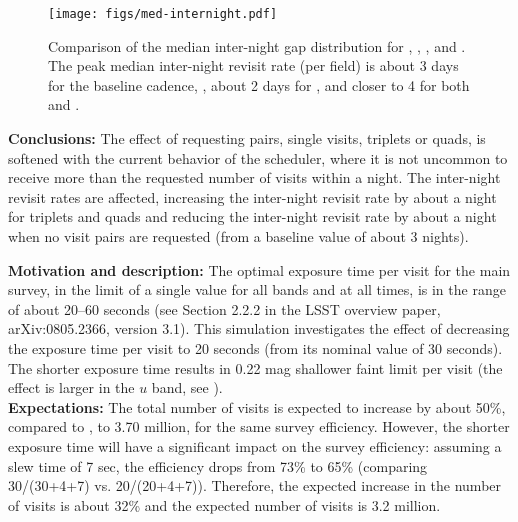 \begin{figure}[h]
\texttt{[image: figs/med-internight.pdf]}
\caption{
Comparison of the median inter-night gap distribution for
, ,
, and
.
The peak median inter-night revisit rate (per field) is about 3 days for the
baseline cadence, , about 2 days for
, and closer to 4 for both
 and
.}
\label{fig:internightgapCompare}
\end{figure}

{\bf Conclusions:}
The effect of requesting pairs, single visits, triplets or quads, is
softened with the current behavior of the scheduler, where it is not
uncommon to receive more than the requested number of visits within a
night. The inter-night revisit rates are affected, increasing the
inter-night revisit rate by about a night for triplets and quads and
reducing the inter-night revisit rate by about a night when no visit
pairs are requested (from a baseline value of about 3 nights).





{\bf Motivation and description:} The optimal exposure time per visit
for the main survey, in the limit of a single value for all bands and
at all times, is in the range of about 20--60 seconds (see Section
2.2.2 in the LSST overview paper, arXiv:0805.2366, version 3.1). This
simulation investigates the effect of decreasing the exposure time per
visit to 20 seconds (from its nominal value of 30 seconds). The
shorter exposure time results in 0.22 mag shallower faint limit per
visit (the effect is larger in the $u$ band, see
). \\

{\bf Expectations:} The total number of visits is expected to increase
by about 50\%, compared to , to 3.70 million,
for the same survey efficiency. However, the shorter exposure time
will have a significant impact on the survey efficiency: assuming a
slew time of 7 sec, the efficiency drops from 73\% to 65\% (comparing
30/(30+4+7) vs. 20/(20+4+7)). Therefore, the expected increase in the
number of visits is about 32\% and the expected number of visits is
3.2 million.  \\

